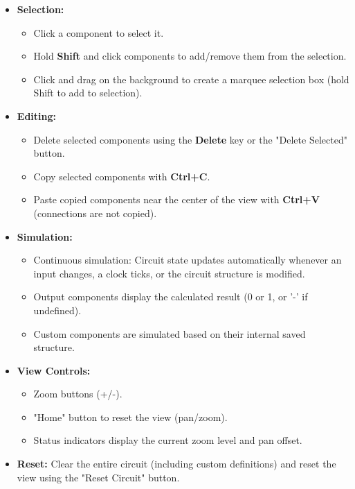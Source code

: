\documentclass[11pt, a4paper]{article}
\begin{document}
\begin{itemize}[leftmargin=*]
\begin{itemize}
    \end{itemize}
    \item \textbf{Selection:}
    \begin{itemize}
        \item Click a component to select it.
        \item Hold \textbf{Shift} and click components to add/remove them from the selection.
        \item Click and drag on the background to create a marquee selection box (hold Shift to add to selection).
    \end{itemize}
    \item \textbf{Editing:}
    \begin{itemize}
        \item Delete selected components using the \textbf{Delete} key or the "Delete Selected" button.
        \item Copy selected components with \textbf{Ctrl+C}.
        \item Paste copied components near the center of the view with \textbf{Ctrl+V} (connections are not copied).
    \end{itemize}
    \item \textbf{Simulation:}
    \begin{itemize}
        \item Continuous simulation: Circuit state updates automatically whenever an input changes, a clock ticks, or the circuit structure is modified.
        \item Output components display the calculated result (0 or 1, or '-' if undefined).
        \item Custom components are simulated based on their internal saved structure.
    \end{itemize}
    \item \textbf{View Controls:}
    \begin{itemize}
        \item Zoom buttons (+/-).
        \item "Home" button to reset the view (pan/zoom).
        \item Status indicators display the current zoom level and pan offset.
    \end{itemize}
    \item \textbf{Reset:} Clear the entire circuit (including custom definitions) and reset the view using the "Reset Circuit" button.
\end{itemize}
\end{document}
